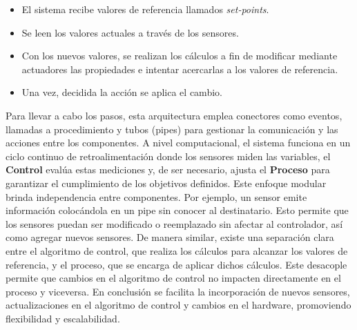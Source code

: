 \begin{itemize}
\item El sistema recibe valores de referencia llamados \textit{set-points}.
\item Se leen los valores actuales a través de los sensores.
\item Con los nuevos valores, se realizan los cálculos a fin de modificar mediante actuadores las propiedades e intentar acercarlas a los valores de referencia.
\item Una vez, decidida la acción se aplica el cambio.
\end{itemize}


Para llevar a cabo los pasos, esta arquitectura emplea conectores como eventos, llamadas a procedimiento y tubos (pipes) para gestionar la comunicación y las acciones entre los componentes. A nivel computacional, el sistema funciona en un ciclo continuo de retroalimentación donde los sensores miden las variables, el \textbf{Control} evalúa estas mediciones y, de ser necesario, ajusta el \textbf{Proceso} para garantizar el cumplimiento de los objetivos definidos. Este enfoque modular brinda independencia entre componentes. Por ejemplo, un sensor emite información colocándola en un pipe sin conocer al destinatario. Esto permite que los sensores puedan ser modificado o reemplazado sin afectar al controlador, así como agregar nuevos sensores. De manera similar, existe una separación clara entre el algoritmo de control, que realiza los cálculos para alcanzar los valores de referencia, y el proceso, que se encarga de aplicar dichos cálculos. Este desacople permite que cambios en el algoritmo de control no impacten directamente en el proceso y viceversa. En conclusión se facilita la incorporación de nuevos sensores, actualizaciones en el algoritmo de control y cambios en el hardware, promoviendo flexibilidad y escalabilidad.

